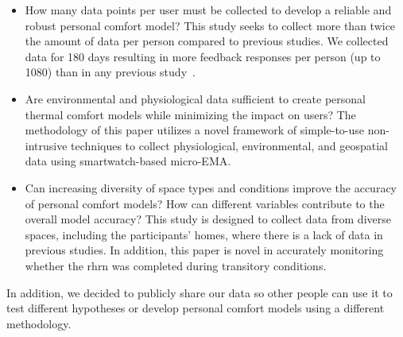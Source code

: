 \begin{itemize}
    \item How many data points per user must be collected to develop a reliable and robust personal comfort model?
        This study seeks to collect more than twice the amount of data per person compared to previous studies.
        We collected data for 180 days resulting in more feedback responses per person (up to 1080) than in any previous study~\cite{ArakawaMartins2022}.
    \item Are environmental and physiological data sufficient to create personal thermal comfort models while minimizing the impact on users? 
        The methodology of this paper utilizes a novel framework of simple-to-use non-intrusive techniques to collect physiological, environmental, and geospatial data using smartwatch-based micro-EMA.
    \item Can increasing diversity of space types and conditions improve the accuracy of personal comfort models?
        How can different variables contribute to the overall model accuracy?
        This study is designed to collect data from diverse spaces, including the participants' homes, where there is a lack of data in previous studies.
        In addition, this paper is novel in accurately monitoring whether the \ac{rhrn} was completed during transitory conditions.
\end{itemize}

In addition, we decided to publicly share our data so other people can use it to test different hypotheses or develop personal comfort models using a different methodology.